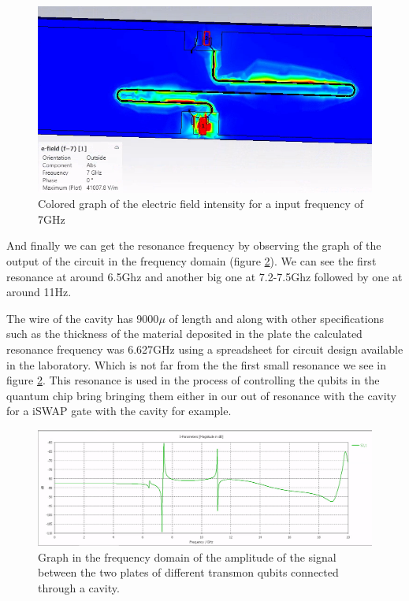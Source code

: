 \documentclass[12pt]{article}
\numberwithin{equation}{subsection}
\begin{document}
\begin{figure}[h]
\centering
\includegraphics[width=\maxwidth,height=\maxheight,keepaspectratio]{images/cst-efield7.png}
\caption{Colored graph of the electric field intensity for a input frequency of 7GHz}
\label{cst-efield7}
\end{figure}

And finally we can get the resonance frequency by observing the graph of the output of the circuit in the frequency domain (figure \ref{cst-freq}). We can see the first resonance at around 6.5Ghz and another big one at 7.2-7.5Ghz followed by one at around 11Hz. 

The wire of the cavity has 9000$\mu$ of length and along with other specifications such as the thickness of the material deposited in the plate the calculated resonance frequency was 6.627GHz using a spreadsheet for circuit design available in the laboratory. Which is not far from the the first small resonance we see in figure \ref{cst-freq}. This resonance is used in the process of controlling the qubits in the quantum chip bring bringing them either in our out of resonance with the cavity for a iSWAP gate with the cavity for example.


\begin{figure}[h]
\centering
\includegraphics[width=\maxwidth,height=\maxheight,keepaspectratio]{images/cst-freq-domain.png}
\caption{Graph in the frequency domain of the amplitude of the signal between the two plates of different transmon qubits connected through a cavity.}
\label{cst-freq}
\end{figure}
\end{document}
